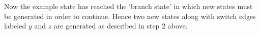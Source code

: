 \documentclass[a4paper,11pt]{article}
\begin{document}
%

\clearpage
Now the example state has reached the `branch state' in which new states must be generated in order to continue. Hence two new states along with switch edges labeled $y$ and $z$ are generated as described in step 2 above.
\end{document}
